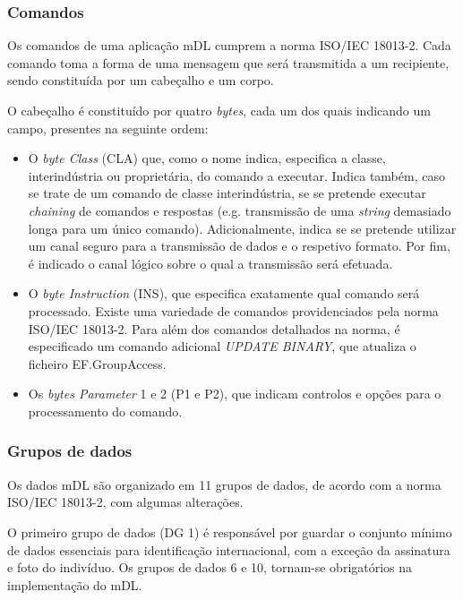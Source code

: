 \subsubsection{Comandos}

Os comandos de uma aplicação mDL cumprem a norma ISO/IEC 18013-2. Cada comando toma a forma de uma mensagem que será transmitida a um recipiente, sendo constituída por um cabeçalho e um corpo.

O cabeçalho é constituído por quatro \textit{bytes}, cada um dos quais indicando um campo, presentes na seguinte ordem:
\begin{itemize}
    \item O \textit{byte Class} (CLA) que, como o nome indica, especifica a classe, interindústria ou proprietária, do comando a executar. Indica também, caso se trate de um comando de classe interindústria, se se pretende executar \textit{chaining} de comandos e respostas (e.g. transmissão de uma \textit{string} demasiado longa para um único comando). Adicionalmente, indica se se pretende utilizar um canal seguro para a transmissão de dados e o respetivo formato. Por fim, é indicado o canal lógico sobre o qual a transmissão será efetuada.

    \item O \textit{byte Instruction} (INS), que especifica exatamente qual comando será processado. Existe uma variedade de comandos providenciados pela norma ISO/IEC 18013-2. Para além dos comandos detalhados na norma, é especificado um comando adicional \textit{UPDATE BINARY}, que atualiza o ficheiro EF.GroupAccess.%

    \item Os \textit{bytes Parameter} 1 e 2 (P1 e P2), que indicam controlos e opções para o processamento do comando.
\end{itemize}


\subsubsection{Grupos de dados}

Os dados mDL são organizado em 11 grupos de dados, de acordo com a norma ISO/IEC 18013-2, com algumas alterações. 

O primeiro grupo de dados (DG 1) é responsável por guardar o conjunto mínimo de dados essenciais para identificação internacional, com a exceção da assinatura e foto do indivíduo. Os grupos de dados 6 e 10, tornam-se obrigatórios na implementação do mDL. 

